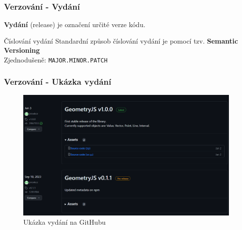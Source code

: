 \begin{frame}
    \frametitle{Verzování - Vydání}
    \begin{definition}[Vydání]
        \textbf{Vydání} (release) je označení určité verze kódu. 
    \end{definition}

    \begin{block}{Číslování vydání}
        Standardní způsob číslování vydání je pomocí tzv. \textbf{Semantic Versioning}\cite{semantic_versioning:2.0.0} \\
        Zjednodušeně: \texttt{MAJOR.MINOR.PATCH}
    \end{block}
\end{frame}

\begin{frame}
    \frametitle{Verzování - Ukázka vydání}
    \begin{figure}
        \centering
        \includegraphics[height=0.7\textheight]{../resources/github-releases.png}
        \caption{Ukázka vydání na GitHubu}
    \end{figure}
\end{frame}